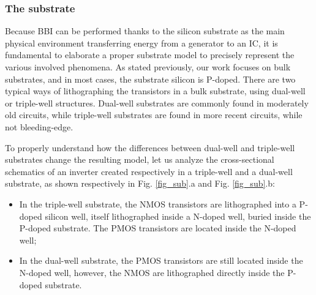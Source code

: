 	\subsubsection{The substrate}
	
	Because BBI can be performed thanks to the silicon substrate as the main physical environment transferring energy from a generator to an IC, it is fundamental to elaborate a proper substrate model to precisely represent the various involved phenomena.
	As stated previously, our work focuses on bulk substrates, and in most cases, the substrate silicon is P-doped.
	There are two typical ways of lithographing the transistors in a bulk substrate, using dual-well or triple-well structures.
	Dual-well substrates are commonly found in moderately old circuits, while triple-well substrates are found in more recent circuits, while not bleeding-edge.

	To properly understand how the differences between dual-well and triple-well substrates change the resulting model, let us analyze the cross-sectional schematics of an inverter created respectively in a triple-well and a dual-well substrate, as shown respectively in Fig. \ref{fig_sub}.a and Fig. \ref{fig_sub}.b:
	\begin{itemize}
		\item In the triple-well substrate, the NMOS transistors are lithographed into a P-doped silicon well, itself lithographed inside a N-doped well, buried inside the P-doped substrate. The PMOS transistors are located inside the N-doped well;
		\item In the dual-well substrate, the PMOS transistors are still located inside the N-doped well, however, the NMOS are lithographed directly inside the P-doped substrate.
	\end{itemize}

